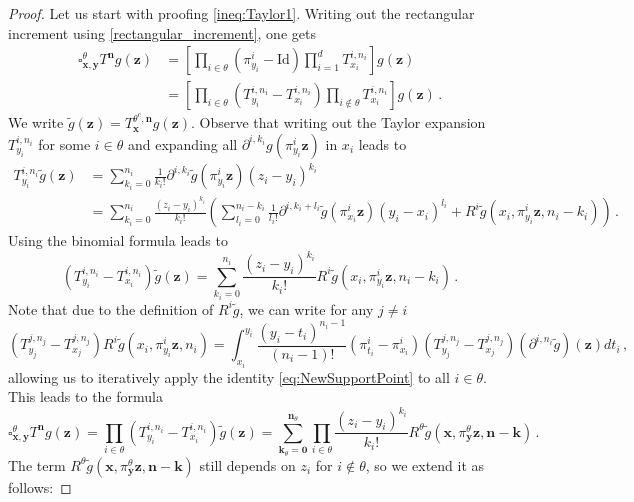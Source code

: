 \documentclass[10pt,a4paper]{amsart}
\def\fk{\mathbf k}\def\fl{\mathbf l}
\def\fl{\mathbf l}
\def\fn{\mathbf n}\def\fN{\mathbf N}
\def\foo{{\boldsymbol 0}}
\def\fx{\mathbf x}
\def\fy{\mathbf y}\def\fz{\mathbf z}
\def\fz{\mathbf z}
\newcommand{\Id}{\mbox{Id}}
\begin{document}
\begin{proof}Let us start with proofing \eqref{ineq:Taylor1}. Writing out the rectangular increment using \eqref{rectangular_increment}, one gets
    \begin{align*}
        \square_{\fx,\fy}^\theta T^\fn g(\fz) &= \left[\prod_{i\in\theta} (\pi^i_{y_i} -\Id) \prod_{i=1}^d T_{x_i}^{i,n_i}\right]g(\fz) \\
        &=\left[\prod_{i\in\theta} (T_{y_i}^{i,n_i}-T_{x_i}^{i,n_i}) \prod_{i\notin\theta} T_{x_i}^{i,n_i}\right]g(\fz)\,.
    \end{align*}
    We write $\tilde g(\fz) = T^{\theta^c,\fn}_\fx g(\fz)$. Observe that writing out the Taylor expansion $T^{i,n_i}_{y_i}$ for some $i\in\theta$ and expanding all $\partial^{i,k_i}g(\pi^i_{y_i}\fz)$ in $x_i$ leads to
     \begin{align*}
        T^{i,n_i}_{y_i} \tilde g(\fz) &= \sum_{k_i=0}^{n_i} \frac{1}{k_i!} \partial^{i,k_i} \tilde g(\pi_{y_i}^i\fz) (z_i-y_i)^{k_i}\\
        &= \sum_{k_i=0}^{n_i}  \frac{(z_i-y_i)^{k_i}}{k_i!} \left( \sum_{l_i= 0}^{n_i-k_i}\frac{1}{l_i!} \partial^{i,k_i+l_i} \tilde g(\pi^i_{x_i}\fz)(y_i-x_i)^{l_i} + R^i\tilde g(x_i,\pi_{y_i}^i\fz,n_i-k_i)\right)\,.
    \end{align*}
    Using the binomial formula leads to
    \begin{equation}\label{eq:NewSupportPoint}
    (T_{y_i}^{i,n_i} -T_{x_i}^{i,n_i})\tilde g(\fz) = \sum_{k_i=0}^{n_i} \frac{(z_i-y_i)^{k_i}}{k_i!} R^i\tilde g(x_i,\pi_{y_i}^i\fz,n_i-k_i)\,.
    \end{equation}
    Note that due to the definition of $R^i\tilde g$, we can write for any $j\neq i$
    \[
    (T^{j,n_j}_{y_j}- T^{j,n_j}_{x_j}) R^i\tilde g(x_i,\pi^i_{y_i}\fz,n_i) = \int_{x_i}^{y_i} \frac{(y_i-t_i)^{n_i-1}}{(n_i-1)!} (\pi^i_{t_i} - \pi^i_{x_i})(T^{j,n_j}_{y_j}- T^{j,n_j}_{x_j})\left(\partial^{i,n_i}\tilde g\right)(\fz) dt_i\,,
    \]
    allowing us to iteratively apply the identity \eqref{eq:NewSupportPoint} to all $i\in\theta$. This leads to the formula
    \begin{equation}\label{eq:rectangIncrementTaylorExpansion}
        \square_{\fx,\fy}^\theta T^\fn g(\fz) = \prod_{i\in\theta}(T^{i,n_i}_{y_i}- T^{i,n_i}_{x_i})\tilde g(\fz) = \sum_{\fk_\theta = \foo}^{\fn_\theta}\prod_{i\in\theta}\frac{(z_i-y_i)^{k_i}}{k_i!} R^\theta \tilde g(\fx,\pi^\theta_\fy \fz,\fn-\fk)\,.
    \end{equation}
    The term $R^\theta \tilde g(\fx,\pi^\theta_\fy \fz,\fn-\fk)$ still depends on $z_i$ for $i\notin\theta$, so we extend it as follows:

\end{proof}
\end{document}
